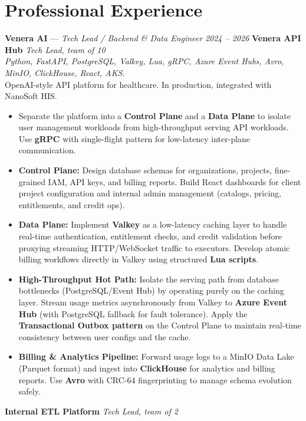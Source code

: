 \documentclass[9pt,a4paper]{extarticle}
\begin{document}
  \section*{Professional Experience}
  \noindent\textbf{Venera AI} --- \textit{Tech Lead / Backend \& Data Engineer}
  \hfill \textit{2024 -- 2026}
  \smallskip
  \noindent\textbf{Venera API Hub} \hfill \textit{Tech Lead, team of 10}\\
    \textit{Python, FastAPI, PostgreSQL, Valkey, Lua, gRPC, Azure Event Hubs, Avro, MinIO,
  ClickHouse, React, AKS.}\\
  OpenAI-style API platform for healthcare. In production, integrated
  with NanoSoft HIS.
  \begin{itemize}
\item Separate the platform into a \textbf{Control Plane} and a \textbf{Data Plane} to isolate user management workloads from high-throughput serving API workloads. Use \textbf{gRPC} with single-flight pattern for low-latency inter-plane communication.
\item \textbf{Control Plane:} Design database schemas for organizations, projects, fine-grained IAM, API keys, and billing reports. Build React dashboards for client project configuration and internal admin management (catalogs, pricing, entitlements, and credit ops).
\item \textbf{Data Plane:} Implement \textbf{Valkey} as a low-latency caching layer to handle real-time authentication, entitlement checks, and credit validation before proxying streaming HTTP/WebSocket traffic to executors. Develop atomic billing workflows directly in Valkey using structured \textbf{Lua scripts}.
\item \textbf{High-Throughput Hot Path:} Isolate the serving path from database bottlenecks (PostgreSQL/Event Hub) by operating purely on the caching layer. Stream usage metrics asynchronously from Valkey to \textbf{Azure Event Hub} (with PostgreSQL fallback for fault tolerance). Apply the \textbf{Transactional Outbox pattern} on the Control Plane to maintain real-time consistency between user configs and the cache.
\item \textbf{Billing \& Analytics Pipeline:} Forward usage logs to a MinIO Data Lake (Parquet format) and ingest into \textbf{ClickHouse} for analytics and billing reports. Use \textbf{Avro} with CRC-64 fingerprinting to manage schema evolution safely.
  \end{itemize}
\smallskip
\noindent\textbf{Internal ETL Platform} \hfill \textit{Tech Lead, team of 2}\\
\end{document}
